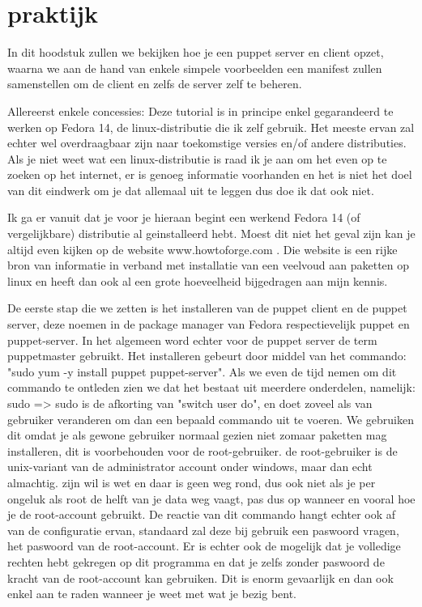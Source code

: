 \chapter{praktijk}

In dit hoodstuk zullen we bekijken hoe je een puppet server en client opzet, waarna we aan de hand van enkele simpele voorbeelden een manifest zullen samenstellen om de client en zelfs de server zelf te beheren.

Allereerst enkele concessies: Deze tutorial is in principe enkel gegarandeerd te werken op Fedora 14, de linux-distributie die ik zelf gebruik. Het meeste ervan zal echter wel overdraagbaar zijn naar toekomstige versies en/of andere distributies. Als je niet weet wat een linux-distributie is raad ik je aan om het even op te zoeken op het internet, er is genoeg informatie voorhanden en het is niet het doel van dit eindwerk om je dat allemaal uit te leggen dus doe ik dat ook niet.

Ik ga er vanuit dat je voor je hieraan begint een werkend Fedora 14 (of vergelijkbare) distributie al geinstalleerd hebt. Moest dit niet het geval zijn kan je altijd even kijken op de website www.howtoforge.com . Die website is een rijke bron van informatie in verband met installatie van een veelvoud aan paketten op linux en heeft dan ook al een grote hoeveelheid bijgedragen aan mijn kennis.



De eerste stap die we zetten is het installeren van de puppet client en de puppet server, deze noemen in de package manager van Fedora respectievelijk puppet en puppet-server. In het algemeen word echter voor de puppet server de term puppetmaster gebruikt. Het installeren gebeurt door middel van het commando: "sudo yum -y install puppet puppet-server". Als we even de tijd nemen om dit commando te ontleden zien we dat het bestaat uit meerdere onderdelen, namelijk: sudo => sudo is de afkorting van "switch user do", en doet zoveel als van gebruiker veranderen om dan een bepaald commando uit te voeren. We gebruiken dit omdat je als gewone gebruiker normaal gezien niet zomaar paketten mag installeren, dit is voorbehouden voor de root-gebruiker. de root-gebruiker is de unix-variant van de administrator account onder windows, maar dan echt almachtig. zijn wil is wet en daar is geen weg rond, dus ook niet als je per ongeluk als root de helft van je data weg vaagt, pas dus op wanneer en vooral hoe je de root-account gebruikt. De reactie van dit commando hangt echter ook af van de configuratie ervan, standaard zal deze bij gebruik een paswoord vragen, het paswoord van de root-account. Er is echter ook de mogelijk dat je volledige rechten hebt gekregen op dit programma en dat je zelfs zonder paswoord de kracht van de root-account kan gebruiken. Dit is enorm gevaarlijk en dan ook enkel aan te raden wanneer je weet met wat je bezig bent.

